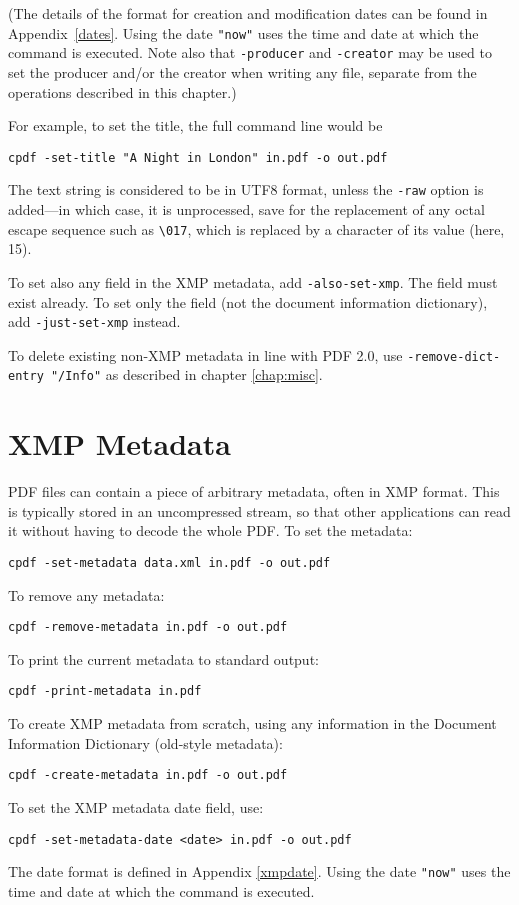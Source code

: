 \documentclass{book}
\begin{document}
  \noindent (The details of the format for creation and modification dates can be found
in Appendix~\ref{dates}. Using the date \texttt{"now"} uses the time and date
at which the command is executed. Note also that \texttt{-producer} and \texttt{-creator} may be used to set the producer and/or the creator when writing any file, separate from the operations described in this chapter.)
  
  \vspace{2mm}
  For example, to set the title, the full command line would be
  \begin{framed}
    \small\verb!cpdf -set-title "A Night in London" in.pdf -o out.pdf!
  \end{framed}
\noindent The text string is considered to be in UTF8 format, unless the \texttt{-raw}
option is added---in which case, it is unprocessed, save for the replacement of any octal escape sequence such as \texttt{\textbackslash 017}, which is replaced by a character of its value (here, 15).

To set also any field in the XMP metadata, add \texttt{-also-set-xmp}. The field must exist already. To set only the field (not the document information dictionary), add \texttt{-just-set-xmp} instead.

To delete existing non-XMP metadata in line with PDF 2.0, use \texttt{-remove-dict-entry "/Info"} as described in chapter \ref{chap:misc}.

  \section{XMP Metadata}
  PDF files can contain a piece of arbitrary metadata, often in XMP format.
This is typically stored in an uncompressed stream, so that other applications
can read it without having to decode the whole PDF. To set the metadata:
  \begin{framed}
    \small\verb!cpdf -set-metadata data.xml in.pdf -o out.pdf!
  \end{framed}
  \noindent To remove any metadata:
  \begin{framed}
    \small\verb!cpdf -remove-metadata in.pdf -o out.pdf!
  \end{framed}
  \noindent To print the current metadata to standard output:
  \begin{framed}
    \small\verb!cpdf -print-metadata in.pdf!
  \end{framed}
  \noindent To create XMP metadata from scratch, using any information in the Document Information Dictionary (old-style metadata):
  \begin{framed}
    \small\verb!cpdf -create-metadata in.pdf -o out.pdf!
  \end{framed}
  \noindent To set the XMP metadata date field, use:
  \begin{framed}
    \small\verb!cpdf -set-metadata-date <date> in.pdf -o out.pdf!
  \end{framed}
\noindent The date format is defined in Appendix \ref{xmpdate}. Using the date \texttt{"now"} uses the time and date
at which the command is executed.
\end{document}
